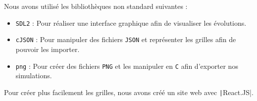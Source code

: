 \documentclass[12pt]{article}
\begin{document}
Nous avons utilisé les bibliothèques non standard suivantes :

\begin{itemize}
    \item \texttt{SDL2} : Pour réaliser une interface graphique afin de visualiser les évolutions.
    \item \texttt{cJSON} : Pour manipuler des fichiers \texttt{JSON} et représenter les grilles afin de pouvoir les importer.
    \item \texttt{png} : Pour créer des fichiers \texttt{PNG} et les manipuler en \texttt{C} afin d'exporter nos simulations.
\end{itemize}

Pour créer plus facilement les grilles, nous avons créé un site web avec \texttt|React.JS|.
\end{document}
